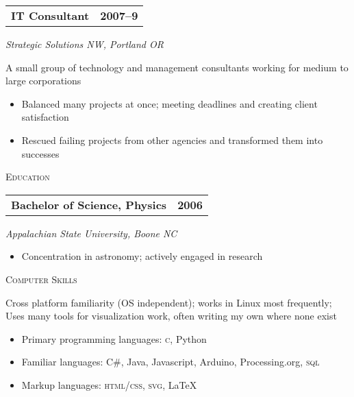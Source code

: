 \documentclass[letterpaper,10pt]{article}
\makeatletter
\newcommand{\resumeheader}[1]{
  \vspace{0.08in}
  \textsc{\Large #1}
  \vspace{0.10in}
}
\newcommand{\resumeitem}[4]{
  {\addtolength{\leftskip}{0.21in}
    \begin{tabular*}{6.25in}{l@{\extracolsep{\fill}} r}
      {\textbf{#1}} & {\textbf{#2}} \\
    \end{tabular*}
    
  }
  
  \vspace{0.01in}
  {\addtolength{\leftskip}{0.3in}
    \textit{#3}\par
  }
  
  \vspace{0.07in}
  {\addtolength{\leftskip}{0.3in}
    \small
    \begin{minipage}{5in}
      #4
    \end{minipage}
    
  }
  \vspace{0.15in}
}
\makeatother
\begin{document}
\resumeitem{IT Consultant}{2007--9}%
           {Strategic Solutions NW, Portland OR}%
           {
              A small group of technology and management consultants working for
              medium to large corporations
              \begin{itemize}[topsep=1pt, itemsep=0pt, parsep=0pt]
                \renewcommand{\labelitemi}{---}
                \item Balanced many projects at once; meeting deadlines and creating client satisfaction
                \item Rescued failing projects from other agencies and transformed them into successes
              \end{itemize}
           }

\resumeheader{Education}

\resumeitem{Bachelor of Science, Physics} {2006}%
           {Appalachian State University, Boone NC}%
           {
              \begin{itemize}[topsep=1pt, itemsep=0pt, parsep=0pt]
                \renewcommand{\labelitemi}{---}
                \item Concentration in astronomy; actively engaged in research
              \end{itemize}
           }
           
\resumeheader{Computer Skills} 

Cross platform familiarity (OS independent); works in Linux most frequently; Uses many tools for visualization work, often writing my own where none exist
\small
\begin{itemize}[topsep=1pt, itemsep=0pt, parsep=0pt]
  \renewcommand{\labelitemi}{---}
  \item Primary programming languages: \textsc{c}, Python
  \item Familiar languages: C\#, Java, Javascript, Arduino, Processing.org, \textsc{sql}
  \item Markup languages: \textsc{html}/\textsc{css}, \textsc{svg}, \LaTeX
\end{itemize}
\end{document}
